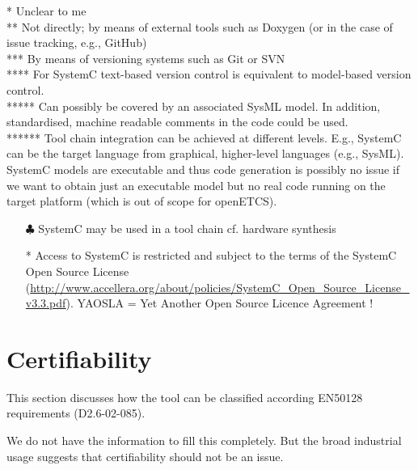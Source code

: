 \begin{author_comment}
  * Unclear to me\\
  ** Not directly; by means of external tools such as Doxygen (or in the case of issue tracking, e.g., GitHub)\\
 *** By means of versioning systems such as Git or SVN\\
**** For SystemC text-based version control is equivalent to model-based version control.\\
***** Can possibly be covered by an associated SysML model. In addition, standardised, machine readable comments in the code could be used.\\
****** Tool chain integration can be achieved at different levels. E.g., SystemC can be the target language from graphical, higher-level languages (e.g., SysML). SystemC models are executable and thus code generation is possibly no issue if we want to obtain just an executable model but no real code running on the target platform (which is out of scope for openETCS).
\end{author_comment}
\begin{assessor1}
\begin{itemize}
\item[$\clubsuit$] SystemC may be used in a tool chain cf. hardware synthesis
\end{itemize}
\end{assessor1}



\begin{assessor2}
  \begin{itemize}
  \item[*] Access to SystemC is restricted and subject to the terms of
    the SystemC Open Source License
    (\url{http://www.accellera.org/about/policies/SystemC_Open_Source_License_v3.3.pdf}). YAOSLA
    = Yet Another Open Source Licence Agreement !
  \end{itemize}  
\end{assessor2}


\section{Certifiability}

This section discusses how the tool can be classified according EN50128 requirements (D2.6-02-085).

\begin{author_comment}
  We do not have the information to fill this completely. But the broad industrial usage suggests that certifiability should not be an issue.
\end{author_comment}

